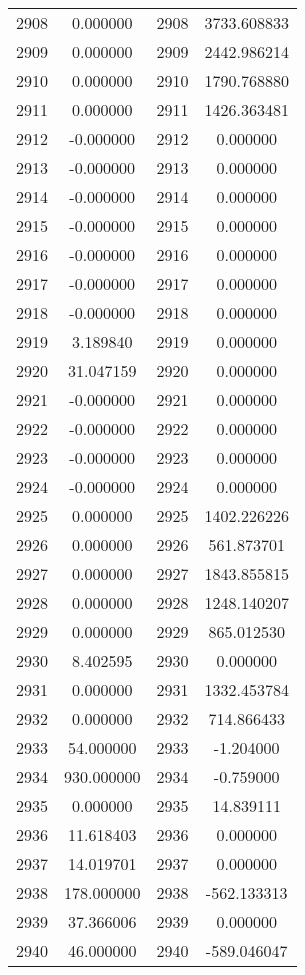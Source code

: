 \documentclass[12pt]{article}
\begin{document}
\begin{longtable}{@{}cccc@{}}
2908 & 0.000000 & 2908 & 3733.608833 \\
2909 & 0.000000 & 2909 & 2442.986214 \\
2910 & 0.000000 & 2910 & 1790.768880 \\
2911 & 0.000000 & 2911 & 1426.363481 \\
2912 & -0.000000 & 2912 & 0.000000 \\
2913 & -0.000000 & 2913 & 0.000000 \\
2914 & -0.000000 & 2914 & 0.000000 \\
2915 & -0.000000 & 2915 & 0.000000 \\
2916 & -0.000000 & 2916 & 0.000000 \\
2917 & -0.000000 & 2917 & 0.000000 \\
2918 & -0.000000 & 2918 & 0.000000 \\
2919 & 3.189840 & 2919 & 0.000000 \\
2920 & 31.047159 & 2920 & 0.000000 \\
2921 & -0.000000 & 2921 & 0.000000 \\
2922 & -0.000000 & 2922 & 0.000000 \\
2923 & -0.000000 & 2923 & 0.000000 \\
2924 & -0.000000 & 2924 & 0.000000 \\
2925 & 0.000000 & 2925 & 1402.226226 \\
2926 & 0.000000 & 2926 & 561.873701 \\
2927 & 0.000000 & 2927 & 1843.855815 \\
2928 & 0.000000 & 2928 & 1248.140207 \\
2929 & 0.000000 & 2929 & 865.012530 \\
2930 & 8.402595 & 2930 & 0.000000 \\
2931 & 0.000000 & 2931 & 1332.453784 \\
2932 & 0.000000 & 2932 & 714.866433 \\
2933 & 54.000000 & 2933 & -1.204000 \\
2934 & 930.000000 & 2934 & -0.759000 \\
2935 & 0.000000 & 2935 & 14.839111 \\
2936 & 11.618403 & 2936 & 0.000000 \\
2937 & 14.019701 & 2937 & 0.000000 \\
2938 & 178.000000 & 2938 & -562.133313 \\
2939 & 37.366006 & 2939 & 0.000000 \\
2940 & 46.000000 & 2940 & -589.046047 \\

\end{longtable}
\end{document}
